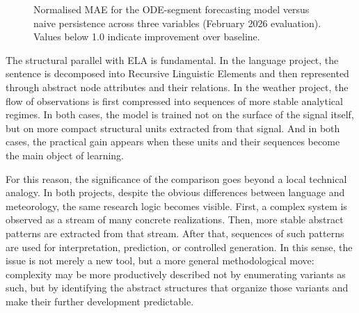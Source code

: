 \documentclass[12pt,a4paper,oneside]{report}
\begin{document}
\begin{figure}[H]
\centering
{}
\caption{Normalised MAE for the ODE-segment forecasting model versus naive persistence across three variables (February 2026 evaluation). Values below 1.0 indicate improvement over baseline.}
\label{fig:weathermae}
\end{figure}

The structural parallel with ELA is fundamental. In the language project, the sentence is decomposed into Recursive Linguistic Elements and then represented through abstract node attributes and their relations. In the weather project, the flow of observations is first compressed into sequences of more stable analytical regimes. In both cases, the model is trained not on the surface of the signal itself, but on more compact structural units extracted from that signal. And in both cases, the practical gain appears when these units and their sequences become the main object of learning.

For this reason, the significance of the comparison goes beyond a local technical analogy. In both projects, despite the obvious differences between language and meteorology, the same research logic becomes visible. First, a complex system is observed as a stream of many concrete realizations. Then, more stable abstract patterns are extracted from that stream. After that, sequences of such patterns are used for interpretation, prediction, or controlled generation. In this sense, the issue is not merely a new tool, but a more general methodological move: complexity may be more productively described not by enumerating variants as such, but by identifying the abstract structures that organize those variants and make their further development predictable.
\end{document}
